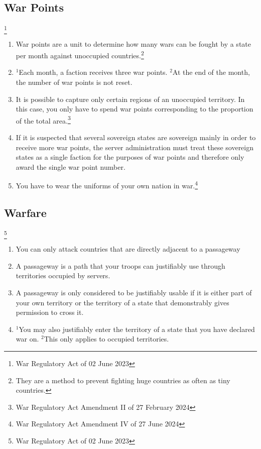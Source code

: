 \documentclass{article}
\newcommand{\sent}[1]{$^{#1}$}
\begin{document}
\subsection{War Points}\footnote{War Regulatory Act of 02 June 2023}
\begin{enumerate}[(1)]
	\item War points are a unit to determine how many wars can be fought by a state per month against unoccupied countries.\footnote{They are a method to prevent fighting huge countries as often as tiny countries.}
	\item \sent{1}Each month, a faction receives three war points. \sent{2}At the end of the month, the number of war points is not reset. %
	\item It is possible to capture only certain regions of an unoccupied territory. In this case, you only have to spend war points corresponding to the proportion of the total area.\footnote{War Regulatory Act Amendment II of 27 February 2024}
	\item If it is suspected that several sovereign states are sovereign mainly in order to receive more war points, the server administration must treat these sovereign states as a single faction for the purposes of war points and therefore only award the single war point number. %
	\item You have to wear the uniforms of your own nation in war.\footnote{War Regulatory Act Amendment IV of 27 June 2024}
\end{enumerate}

\subsection{Warfare}\footnote{War Regulatory Act of 02 June 2023}
\begin{enumerate}[(1)]
	\item You can only attack countries that are directly adjacent to a passageway
	\item A passageway is a path that your troops can justifiably use through territories occupied by servers.
	\item A passageway is only considered to be justifiably usable if it is either part of your own territory or the territory of a state that demonstrably gives permission to cross it.
	\item \sent{1}You may also justifiably enter the territory of a state that you have declared war on. \sent{2}This only applies to occupied territories.
\end{enumerate}
\end{document}
